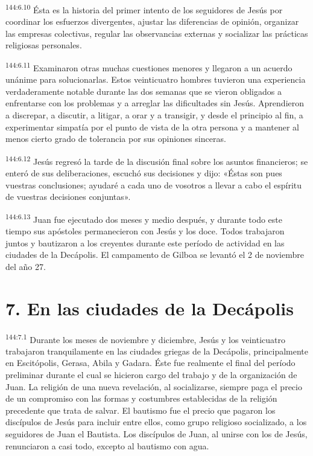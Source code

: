 \par 
\textsuperscript{144:6.10} Ésta es la historia del primer intento de los seguidores de Jesús por coordinar los esfuerzos divergentes, ajustar las diferencias de opinión, organizar las empresas colectivas, regular las observancias externas y socializar las prácticas religiosas personales.

\par 
\textsuperscript{144:6.11} Examinaron otras muchas cuestiones menores y llegaron a un acuerdo unánime para solucionarlas. Estos veinticuatro hombres tuvieron una experiencia verdaderamente notable durante las dos semanas que se vieron obligados a enfrentarse con los problemas y a arreglar las dificultades sin Jesús. Aprendieron a discrepar, a discutir, a litigar, a orar y a transigir, y desde el principio al fin, a experimentar simpatía por el punto de vista de la otra persona y a mantener al menos cierto grado de tolerancia por sus opiniones sinceras.

\par 
\textsuperscript{144:6.12} Jesús regresó la tarde de la discusión final sobre los asuntos financieros; se enteró de sus deliberaciones, escuchó sus decisiones y dijo: «Éstas son pues vuestras conclusiones; ayudaré a cada uno de vosotros a llevar a cabo el espíritu de vuestras decisiones conjuntas».

\par 
\textsuperscript{144:6.13} Juan fue ejecutado dos meses y medio después, y durante todo este tiempo sus apóstoles permanecieron con Jesús y los doce. Todos trabajaron juntos y bautizaron a los creyentes durante este período de actividad en las ciudades de la Decápolis. El campamento de Gilboa se levantó el 2 de noviembre del año 27.

\section*{7. En las ciudades de la Decápolis}
\par 
\textsuperscript{144:7.1} Durante los meses de noviembre y diciembre, Jesús y los veinticuatro trabajaron tranquilamente en las ciudades griegas de la Decápolis, principalmente en Escitópolis, Gerasa, Abila y Gadara. Éste fue realmente el final del período preliminar durante el cual se hicieron cargo del trabajo y de la organización de Juan. La religión de una nueva revelación, al socializarse, siempre paga el precio de un compromiso con las formas y costumbres establecidas de la religión precedente que trata de salvar. El bautismo fue el precio que pagaron los discípulos de Jesús para incluir entre ellos, como grupo religioso socializado, a los seguidores de Juan el Bautista. Los discípulos de Juan, al unirse con los de Jesús, renunciaron a casi todo, excepto al bautismo con agua.

